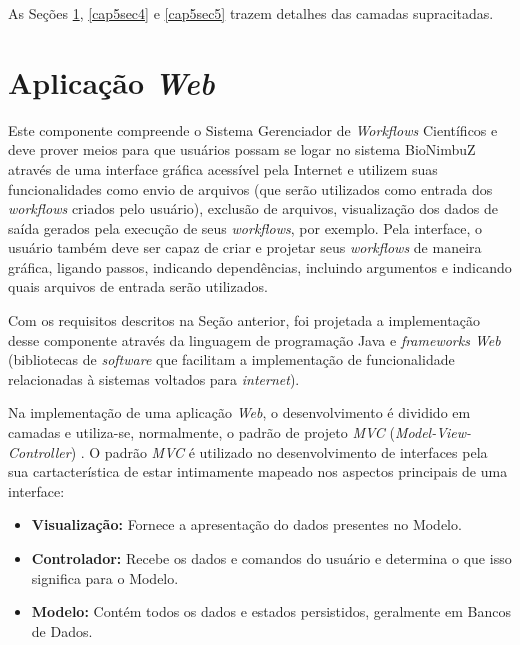 As Seções \ref{cap5sec3}, \ref{cap5sec4} e \ref{cap5sec5} trazem detalhes das camadas supracitadas.

\section{Aplicação \textit{Web}} \label{cap5sec3}
    
	Este componente compreende o Sistema Gerenciador de \textit{Workflows} Científicos e deve prover meios para que usuários possam se logar no sistema BioNimbuZ através de uma interface gráfica acessível pela Internet e utilizem suas funcionalidades como envio de arquivos (que serão utilizados como entrada dos \textit{workflows} criados pelo usuário), exclusão de arquivos, visualização dos dados de saída gerados pela execução de seus \textit{workflows}, por exemplo. Pela interface, o usuário também deve ser capaz de criar e projetar seus \textit{workflows} de maneira gráfica, ligando passos, indicando dependências, incluindo argumentos e indicando quais arquivos de entrada serão utilizados.
    
Com os requisitos descritos na Seção anterior, foi projetada a implementação desse componente através da linguagem de programação Java e \textit{frameworks Web} (bibliotecas de \textit{software} que facilitam a implementação de funcionalidade relacionadas à sistemas voltados para \textit{internet}). 

Na implementação de uma aplicação \textit{Web}, o desenvolvimento é dividido em camadas e utiliza-se, normalmente, o padrão de projeto \textit{MVC} (\textit{Model-View-Controller}) \cite{design_patterns}. O padrão \textit{MVC} é utilizado no desenvolvimento de interfaces pela sua cartacterística de estar intimamente mapeado nos aspectos principais de uma interface: 

\begin{itemize}
	\item \textbf{Visualização:} Fornece a apresentação do dados presentes no Modelo.
    \item \textbf{Controlador:} Recebe os dados e comandos do usuário e determina o que isso significa para o Modelo.
    \item \textbf{Modelo:} Contém todos os dados e estados persistidos, geralmente em Bancos de Dados.
\end{itemize}

